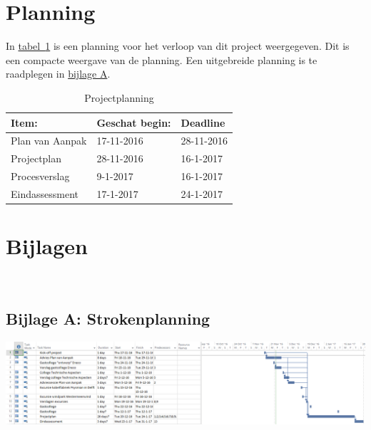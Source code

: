 \documentclass[numbers=endperiod]{scrartcl}
\newcommand{\sectionSmall}[1]{
	\vspace{-10pt}
	\section{#1}
	\vspace{-5pt}
}
\newcommand{\whitespace}{\vspace*{2 mm} \\}%
\newcommand{\tableref}[1]{\hyperref[table:#1]{tabel~\ref{table:#1}}}
\begin{document}
	\sectionSmall{Planning}
	In \tableref{Planning} is een planning voor het verloop van dit project weergegeven. Dit is een compacte weergave van de planning. Een uitgebreide planning is te raadplegen in \hyperref[sec:BijlageA]{bijlage A}.
	\begin{table}[h]
		\caption{Projectplanning}\label{table:Planning}
		\centering
		\begin{tabular}{| p{} | p{} | p{} |}
			\hline \rowcolor{hhs_theme_heading_2}
			Item: 				& Geschat begin:& Deadline \\ \hline
			Plan van Aanpak 	& 17-11-2016 	& 28-11-2016 \\ \hline
			Projectplan		 	& 28-11-2016	& 16-1-2017 \\ \hline
			Procesverslag		& 9-1-2017		& 16-1-2017 \\ \hline
			Eindassessment		& 17-1-2017		& 24-1-2017 \\ \hline
		\end{tabular}
	\end{table}
	
	\newpage
	\printbibliography
	
	\newpage
	\setcounter{secnumdepth}{0}%
	\sectionSmall{Bijlagen}
	\whitespace
	\subsection{Bijlage A: Strokenplanning} \label{sec:BijlageA}
	\includegraphics[angle=270,origin=c,scale=0.5]{Planning.PNG}	
\end{document}
